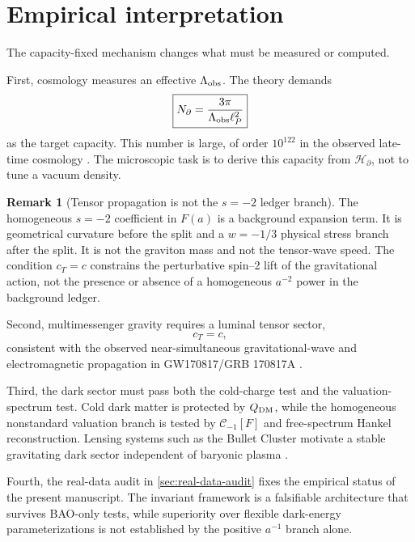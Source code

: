 \documentclass[aps,prd,reprint,nofootinbib,superscriptaddress,floatfix]{revtex4-2}
\numberwithin{equation}{section}
\theoremstyle{definition}
\newtheorem{remark}{Remark}[section]
\theoremstyle{plain}
\newcommand{\Ncap}{N_{\partial}}
\begin{document}
\section{Empirical interpretation}

The capacity-fixed mechanism changes what must be measured or computed.

First, cosmology measures an effective \(\Lambda_{\rm obs}\).  The theory demands
\begin{equation}
\boxed{
\Ncap
=
\frac{3\pi}{\Lambda_{\rm obs}\ell_P^2}
}
\end{equation}
as the target capacity.  This number is large, of order \(10^{122}\) in the observed late-time cosmology \cite{Planck2018}.  The microscopic task is to derive this capacity from \(\mathcal H_\partial\), not to tune a vacuum density.


\begin{remark}[Tensor propagation is not the \(s=-2\) ledger branch]
The homogeneous \(s=-2\) coefficient in \(F(a)\) is a background expansion term.  It is geometrical curvature before the split and a \(w=-1/3\) physical stress branch after the split.  It is not the graviton mass and not the tensor-wave speed.  The condition \(c_T=c\) constrains the perturbative spin--2 lift of the gravitational action, not the presence or absence of a homogeneous \(a^{-2}\) power in the background ledger.
\end{remark}


Second, multimessenger gravity requires a luminal tensor sector,
\begin{equation}
\boxed{c_T=c,}
\end{equation}
consistent with the observed near-simultaneous gravitational-wave and electromagnetic propagation in GW170817/GRB 170817A \cite{AbbottGW170817,MonitorGRB170817A}.

Third, the dark sector must pass both the cold-charge test and the valuation-spectrum test.  Cold dark matter is protected by \(Q_{\rm DM}\), while the homogeneous nonstandard valuation branch is tested by \(\mathcal C_{-1}[F]\) and free-spectrum Hankel reconstruction.  Lensing systems such as the Bullet Cluster motivate a stable gravitating dark sector independent of baryonic plasma \cite{Clowe2006,Markevitch2004}.

Fourth, the real-data audit in \cref{sec:real-data-audit} fixes the empirical status of the present manuscript.  The invariant framework is a falsifiable architecture that survives BAO-only tests, while superiority over flexible dark-energy parameterizations is not established by the positive \(a^{-1}\) branch alone.
\end{document}
